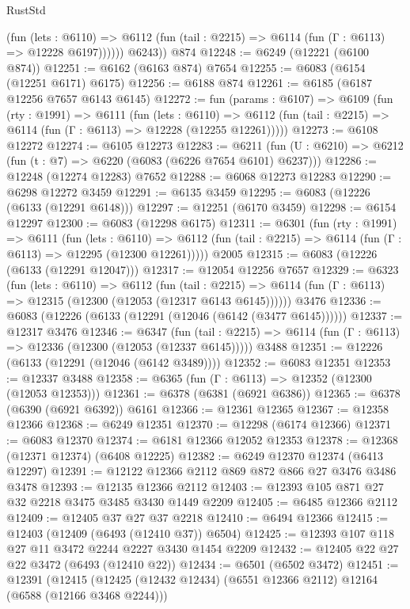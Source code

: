 \begin{lexlean}{RustStd}
\begin{coremodule}
              (fun (lets : @6110) =>
              @6112 (fun (tail : @2215) => @6114 (fun (Γ : @6113) => @12228 @6197))))))
        @6243))
    @874
@12248 := @6249 (@12221 (@6100 @874))
@12251 := @6162 (@6163 @874) @7654
@12255 := @6083 (@6154 (@12251 @6171) @6175)
@12256 := @6188 @874
@12261 := @6185 (@6187 @12256 @7657 @6143 @6145)
@12272 := fun (params : @6107) =>
  @6109
    (fun (rty : @1991) =>
    @6111
      (fun (lets : @6110) =>
      @6112 (fun (tail : @2215) => @6114 (fun (Γ : @6113) => @12228 (@12255 @12261)))))
@12273 := @6108 @12272
@12274 := @6105 @12273
@12283 := @6211 (fun (U : @6210) => @6212 (fun (t : @7) => @6220 (@6083 (@6226 @7654 @6101) @6237)))
@12286 := @12248 (@12274 @12283) @7652
@12288 := @6068 @12273 @12283
@12290 := @6298 @12272 @3459
@12291 := @6135 @3459
@12295 := @6083 (@12226 (@6133 (@12291 @6148)))
@12297 := @12251 (@6170 @3459)
@12298 := @6154 @12297
@12300 := @6083 (@12298 @6175)
@12311 := @6301
    (fun (rty : @1991) =>
    @6111
      (fun (lets : @6110) =>
      @6112 (fun (tail : @2215) => @6114 (fun (Γ : @6113) => @12295 (@12300 @12261)))))
    @2005
@12315 := @6083 (@12226 (@6133 (@12291 @12047)))
@12317 := @12054 @12256 @7657
@12329 := @6323
    (fun (lets : @6110) =>
    @6112
      (fun (tail : @2215) =>
      @6114 (fun (Γ : @6113) => @12315 (@12300 (@12053 (@12317 @6143 @6145))))))
    @3476
@12336 := @6083 (@12226 (@6133 (@12291 (@12046 (@6142 (@3477 @6145))))))
@12337 := @12317 @3476
@12346 := @6347
    (fun (tail : @2215) => @6114 (fun (Γ : @6113) => @12336 (@12300 (@12053 (@12337 @6145)))))
    @3488
@12351 := @12226 (@6133 (@12291 (@12046 (@6142 @3489))))
@12352 := @6083 @12351
@12353 := @12337 @3488
@12358 := @6365 (fun (Γ : @6113) => @12352 (@12300 (@12053 @12353)))
@12361 := @6378 (@6381 (@6921 @6386))
@12365 := @6378 (@6390 (@6921 @6392)) @6161
@12366 := @12361 @12365
@12367 := @12358 @12366
@12368 := @6249 @12351
@12370 := @12298 (@6174 @12366)
@12371 := @6083 @12370
@12374 := @6181 @12366 @12052 @12353
@12378 := @12368 (@12371 @12374) (@6408 @12225)
@12382 := @6249 @12370 @12374 (@6413 @12297)
@12391 := @12122 @12366 @2112 @869 @872 @866 @27 @3476 @3486 @3478
@12393 := @12135 @12366 @2112
@12403 := @12393 @105 @871 @27 @32 @2218 @3475 @3485 @3430 @1449 @2209
@12405 := @6485 @12366 @2112
@12409 := @12405 @37 @27 @37 @2218
@12410 := @6494 @12366
@12415 := @12403 (@12409 (@6493 (@12410 @37)) @6504)
@12425 := @12393 @107 @118 @27 @11 @3472 @2244 @2227 @3430 @1454 @2209
@12432 := @12405 @22 @27 @22 @3472 (@6493 (@12410 @22))
@12434 := @6501 (@6502 @3472)
@12451 := @12391
    (@12415
      (@12425 (@12432 @12434) (@6551 @12366 @2112) @12164 (@6588 (@12166 @3468 @2244)))

\end{coremodule}
\end{lexlean}
